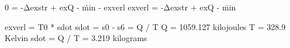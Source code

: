 0 = -Δexstr + exQ - ṁin - exverl  
exverl = -Δexstr + exQ - ṁin  

exverl = T0 * sdot  
sdot = s0 - s6 = Q / T  
Q = 1059.127 kilojoules  
T = 328.9 Kelvin  
sdot = Q / T = 3.219 kilograms
